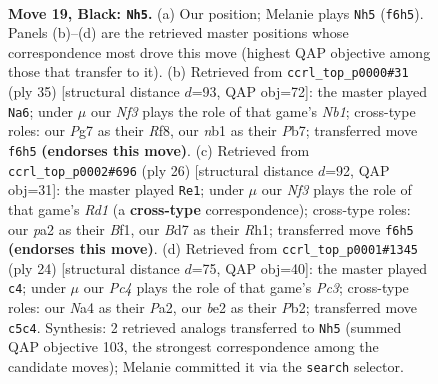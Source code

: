 \documentclass[11pt]{article}
\begin{document}
\clearpage

\begin{figure}[p]\centering
\begin{subfigure}{0.46\textwidth}\centering
\resizebox{\linewidth}{!}{%
\newchessgame
\chessboard[
  setfen={5rk1/3brppp/4pn2/p1pq4/n7/3NP1P1/PP2BRPP/RNQ3K1 b - - 3 19},
  showmover=false,
  pgfstyle=straightmove, color=movearrow, markmove={f6-h5}
]}
\caption{}
\end{subfigure}\hfill
\begin{subfigure}{0.46\textwidth}\centering
\resizebox{\linewidth}{!}{%
\newchessgame
\chessboard[
  setfen={rn3rk1/1ppq1pp1/4bn1p/pNPp4/3P2P1/2N1R3/PP1Q1PBP/4R1K1 b - - 0 18},
  showmover=false,
  pgfstyle=straightmove, color=movearrow, markmove={b8-a6}
]}
\caption{}
\end{subfigure}
\\[4pt]
\begin{subfigure}{0.46\textwidth}\centering
\resizebox{\linewidth}{!}{%
\newchessgame
\chessboard[
  setfen={1r3rk1/p3b1pp/3qpn2/1ppp4/4P3/3P3Q/PPPN2PP/1K1R1B1R w - - 0 14},
  showmover=false,
  pgfstyle=straightmove, color=movearrow, markmove={d1-e1}
]}
\caption{}
\end{subfigure}\hfill
\begin{subfigure}{0.46\textwidth}\centering
\resizebox{\linewidth}{!}{%
\newchessgame
\chessboard[
  setfen={rn3rk1/ppq1bppp/2p5/3n1b2/3QN3/2PB1N2/PP3PPP/R1B2RK1 w - - 3 13},
  showmover=false,
  pgfstyle=straightmove, color=movearrow, markmove={c3-c4}
]}
\caption{}
\end{subfigure}
\caption{\textbf{Move 19, Black: \texttt{Nh5}.} (a) Our position; Melanie plays \texttt{Nh5} (\texttt{f6h5}). Panels (b)--(d) are the retrieved master positions whose correspondence most drove this move (highest QAP objective among those that transfer to it). (b) Retrieved from \texttt{ccrl\_top\_p0000\#31} (ply 35) [structural distance $d$=93, QAP obj=72]: the master played \texttt{Na6}; under $\mu$ our \emph{Nf3} plays the role of that game's \emph{Nb1}; cross-type roles: our \emph{P}g7 as their \emph{R}f8, our \emph{n}b1 as their \emph{P}b7; transferred move \texttt{f6h5} \textbf{(endorses this move)}. (c) Retrieved from \texttt{ccrl\_top\_p0002\#696} (ply 26) [structural distance $d$=92, QAP obj=31]: the master played \texttt{Re1}; under $\mu$ our \emph{Nf3} plays the role of that game's \emph{Rd1} (a \textbf{cross-type} correspondence); cross-type roles: our \emph{p}a2 as their \emph{B}f1, our \emph{B}d7 as their \emph{R}h1; transferred move \texttt{f6h5} \textbf{(endorses this move)}. (d) Retrieved from \texttt{ccrl\_top\_p0001\#1345} (ply 24) [structural distance $d$=75, QAP obj=40]: the master played \texttt{c4}; under $\mu$ our \emph{Pc4} plays the role of that game's \emph{Pc3}; cross-type roles: our \emph{N}a4 as their \emph{P}a2, our \emph{b}e2 as their \emph{P}b2; transferred move \texttt{c5c4}. Synthesis: 2 retrieved analogs transferred to \texttt{Nh5} (summed QAP objective 103, the strongest correspondence among the candidate moves); Melanie committed it via the \texttt{search} selector.}
\label{fig:thought-m37}
\end{figure}
\end{document}
